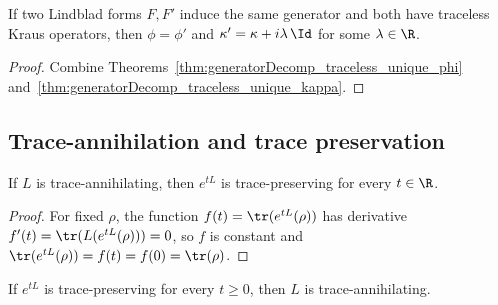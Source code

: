 \begin{theorem}
    \label{thm:generatorDecomp_traceless_unique}
    \leanok
    If two Lindblad forms $F, F'$ induce the same generator and
    both have traceless Kraus operators, then $\phi = \phi'$ and
    $\kappa' = \kappa + i\lambda\,\Id$ for some $\lambda \in \R$.
\end{theorem}

\begin{proof}\leanok
    Combine Theorems~\ref{thm:generatorDecomp_traceless_unique_phi}
    and~\ref{thm:generatorDecomp_traceless_unique_kappa}.
\end{proof}

\subsection{Trace-annihilation and trace preservation}

\begin{theorem}
    \label{thm:ta_implies_tp_semigroup}
    \leanok
    If $L$ is trace-annihilating, then $e^{tL}$ is trace-preserving for every
    $t \in \R$.
\end{theorem}

\begin{proof}
    \leanok
    For fixed $\rho$, the function $f(t) = \tr(e^{tL}(\rho))$ has derivative
    $f'(t) = \tr(L(e^{tL}(\rho))) = 0$, so $f$ is constant and
    $\tr(e^{tL}(\rho)) = f(t) = f(0) = \tr(\rho)$.
\end{proof}

\begin{theorem}
    \label{thm:tp_semigroup_implies_ta}
    \leanok
    If $e^{tL}$ is trace-preserving for every $t \ge 0$, then $L$ is
    trace-annihilating.
\end{theorem}

